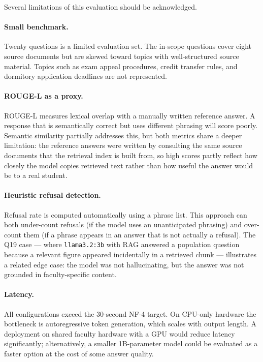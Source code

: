Several limitations of this evaluation should be acknowledged.
 
\paragraph{Small benchmark.}
Twenty questions is a limited evaluation set. The in-scope questions cover
eight source documents but are skewed toward topics with well-structured source
material. Topics such as exam appeal procedures, credit transfer rules, and
dormitory application deadlines are not represented.
 
\paragraph{ROUGE-L as a proxy.}
ROUGE-L measures lexical overlap with a manually written reference answer. A
response that is semantically correct but uses different phrasing will score
poorly. Semantic similarity partially addresses this, but both metrics share a
deeper limitation: the reference answers were written by consulting the same
source documents that the retrieval index is built from, so high scores partly
reflect how closely the model copies retrieved text rather than how useful the
answer would be to a real student.
 
\paragraph{Heuristic refusal detection.}
Refusal rate is computed automatically using a phrase list. This approach can
both under-count refusals (if the model uses an unanticipated phrasing) and
over-count them (if a phrase appears in an answer that is not actually a
refusal). The Q19 case --- where \texttt{llama3.2:3b} with RAG answered a
population question because a relevant figure appeared incidentally in a
retrieved chunk --- illustrates a related edge case: the model was not
hallucinating, but the answer was not grounded in faculty-specific content.
 
\paragraph{Latency.}
All configurations exceed the 30-second NF-4 target. On CPU-only hardware the
bottleneck is autoregressive token generation, which scales with output length.
A deployment on shared faculty hardware with a GPU would reduce latency
significantly; alternatively, a smaller 1B-parameter model could be evaluated
as a faster option at the cost of some answer quality.